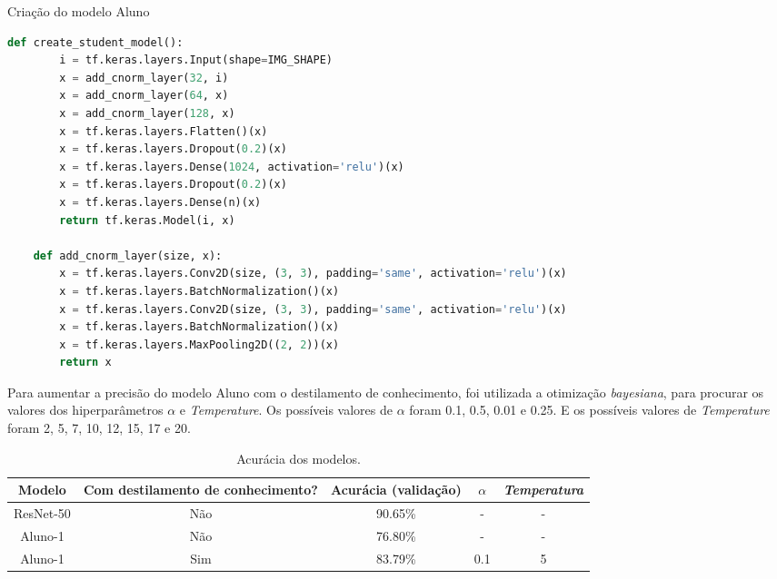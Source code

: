 \begin{codigo}[!htb]
    \caption{Criação do modelo Aluno}
    \label{res_aluno_1}
    \begin{lstlisting}[language = python]
	def create_student_model():
		i = tf.keras.layers.Input(shape=IMG_SHAPE)
		x = add_cnorm_layer(32, i)
		x = add_cnorm_layer(64, x)
		x = add_cnorm_layer(128, x)
		x = tf.keras.layers.Flatten()(x)
		x = tf.keras.layers.Dropout(0.2)(x)
		x = tf.keras.layers.Dense(1024, activation='relu')(x)
		x = tf.keras.layers.Dropout(0.2)(x)
		x = tf.keras.layers.Dense(n)(x)
		return tf.keras.Model(i, x)

	def add_cnorm_layer(size, x):
		x = tf.keras.layers.Conv2D(size, (3, 3), padding='same', activation='relu')(x)
		x = tf.keras.layers.BatchNormalization()(x)
		x = tf.keras.layers.Conv2D(size, (3, 3), padding='same', activation='relu')(x)
		x = tf.keras.layers.BatchNormalization()(x)
		x = tf.keras.layers.MaxPooling2D((2, 2))(x)
		return x
    \end{lstlisting}
\end{codigo}

Para aumentar a precisão do modelo Aluno com o destilamento de conhecimento, foi utilizada a otimização
\textit{bayesiana}, para procurar os valores dos hiperparâmetros $\alpha$ e \textit{Temperature}.
Os possíveis valores de $\alpha$ foram 0.1, 0.5, 0.01 e 0.25.
E os possíveis valores de \textit{Temperature} foram 2, 5, 7, 10, 12, 15, 17 e 20.

\begin{center}
\begin{table}[htb]
\ABNTEXfontereduzida
\caption[Acurácia dos modelos]{Acurácia dos modelos.}
\label{tab-nivinv}
\begin{tabular}{ |c|c|c|c|c| }
	\hline
	\textbf{Modelo} & \textbf{Com destilamento de conhecimento?}  & \textbf{Acurácia (validação)}
		   & \textbf{$\alpha$} & \textbf{\textit{Temperatura}} \\
	\hline
	ResNet-50 	& 	Não 	& 	90.65\%	& 	- 	& 	-	 \\
	Aluno-1 	& 	Não 	& 	76.80\%	& 	- 	& 	-	 \\
	Aluno-1 	& 	Sim 	& 	83.79\%	& 	0.1 	& 	5	 \\
	\hline
\end{tabular}
\end{table}
\end{center}

